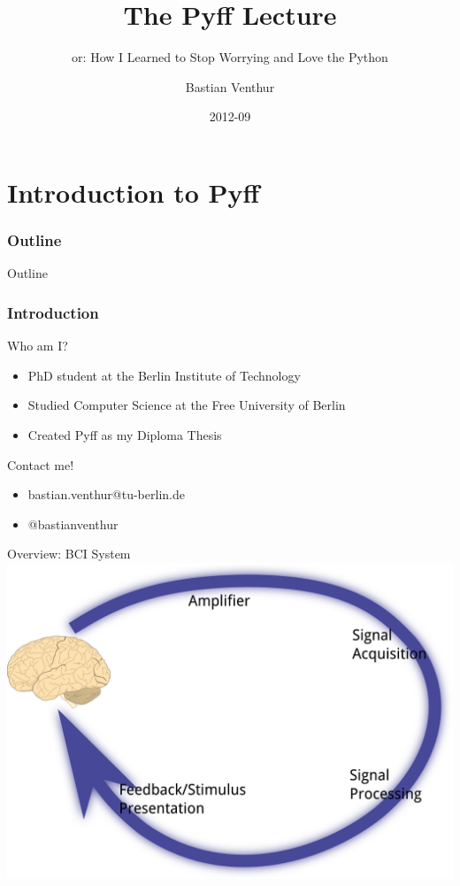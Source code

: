 \documentclass{beamer}
\title{The Pyff Lecture}
\subtitle{or: How I Learned to Stop Worrying and Love the Python}
\author{Bastian Venthur}
\institute{Berlin Institute of Technology}
\date{2012-09}
\begin{document}
\begin{frame}[plain]
    \titlepage
\end{frame}

\part{Introduction to Pyff}

\section*{Outline}
\begin{frame}{Outline}
    \tableofcontents[hidesubsections]
\end{frame}

\section{Introduction}
\begin{frame}{Who am I?}
    \begin{itemize}
        \item PhD student at the Berlin Institute of Technology
        \item Studied Computer Science at the Free University of Berlin
        \item Created Pyff as my Diploma Thesis
    \end{itemize}
    \vfill
    \begin{box}{Contact me!}
        \begin{itemize}
            \item bastian.venthur@tu-berlin.de
            \item @bastianventhur
        \end{itemize}
    \end{box}
\end{frame}

\begin{frame}{Overview: BCI System}
    \includegraphics[width=\linewidth]{bci_system}
\end{frame}
\end{document}
